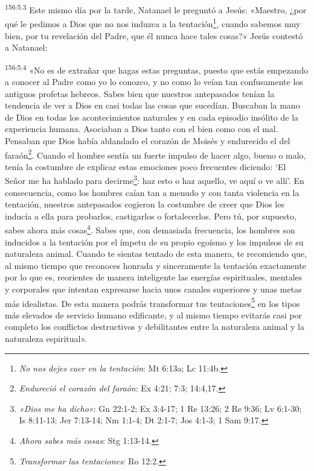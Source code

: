 \par 
\textsuperscript{156:5.3} Este mismo día por la tarde, Natanael le preguntó a Jesús: «Maestro, ¿por qué le pedimos a Dios que no nos induzca a la tentación\footnote{\textit{No nos dejes caer en la tentación}: Mt 6:13a; Lc 11:4b.}, cuando sabemos muy bien, por tu revelación del Padre, que él nunca hace tales cosas?» Jesús contestó a Natanael:

\par 
\textsuperscript{156:5.4} «No es de extrañar que hagas estas preguntas, puesto que estás empezando a conocer al Padre como yo lo conozco, y no como lo veían tan confusamente los antiguos profetas hebreos. Sabes bien que nuestros antepasados tenían la tendencia de ver a Dios en casi todas las cosas que sucedían. Buscaban la mano de Dios en todas los acontecimientos naturales y en cada episodio insólito de la experiencia humana. Asociaban a Dios tanto con el bien como con el mal. Pensaban que Dios había ablandado el corazón de Moisés y endurecido el del faraón\footnote{\textit{Endureció el corazón del faraón}: Ex 4:21; 7:3; 14:4,17.}. Cuando el hombre sentía un fuerte impulso de hacer algo, bueno o malo, tenía la costumbre de explicar estas emociones poco frecuentes diciendo: `El Señor me ha hablado para decirme\footnote{\textit{«Dios me ha dicho»}: Gn 22:1-2; Ex 3:4-17; 1 Re 13:26; 2 Re 9:36; Lv 6:1-30; Is 8:11-13; Jer 7:13-14; Nm 1:1-4; Dt 2:1-7; Jos 4:1-3; 1 Sam 9:17.}: haz esto o haz aquello, ve aquí o ve allí'. En consecuencia, como los hombres caían tan a menudo y con tanta violencia en la tentación, nuestros antepasados cogieron la costumbre de creer que Dios les inducía a ella para probarlos, castigarlos o fortalecerlos. Pero tú, por supuesto, sabes ahora más cosas\footnote{\textit{Ahora sabes más cosas}: Stg 1:13-14.}. Sabes que, con demasiada frecuencia, los hombres son inducidos a la tentación por el ímpetu de su propio egoísmo y los impulsos de su naturaleza animal. Cuando te sientas tentado de esta manera, te recomiendo que, al mismo tiempo que reconoces honrada y sinceramente la tentación exactamente por lo que es, reorientes de manera inteligente las energías espirituales, mentales y corporales que intentan expresarse hacia unos canales superiores y unas metas más idealistas. De esta manera podrás transformar tus tentaciones\footnote{\textit{Transformar las tentaciones}: Ro 12:2.} en los tipos más elevados de servicio humano edificante, y al mismo tiempo evitarás casi por completo los conflictos destructivos y debilitantes entre la naturaleza animal y la naturaleza espiritual».

